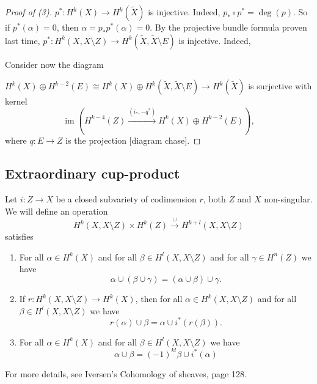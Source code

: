 \documentclass[A4paper, british, reqno]{amsart}
\theoremstyle{darkgreentheorem}
\theoremstyle{darkbluedefinition}
\theoremstyle{darkredexample}
\theoremstyle{remark}
\DeclareMathOperator{\im}{im}
\newcommand{\1}{\mathbbm{1}}
\newcommand{\op}{\oplus}
\begin{document}
\begin{proof}[Proof of (3)]
    $p^{*}\colon H^{k}(X)\to H^{k}(\tilde{X})$ is injective.
    Indeed, $p_{*}\circ p^{*}=\deg(p)$.
    So if $p^{*}(\alpha)=0$, then $\alpha=p_{*}p^{*}(\alpha)=0$.
    By the projective bundle formula proven last time, $p^{*}\colon H^{k}(X,X\setminus Z)\to H^{k}(\tilde{X},\tilde{X}\setminus E)$ is injective.
    Indeed,
    \begin{center}
    \end{center}
    Consider now the diagram
    \begin{center}
    \end{center}
    $H^{k}(X)\op H^{k-2}(E)\cong H^{k}(X)\op H^{k}(\tilde{X},\tilde{X}\setminus E)\to H^{k}(\tilde{X})$ is surjective with kernel
    \[ \im(H^{k-4}(Z)\xrightarrow{(i_{*},-q^{*})} H^{k}(X)\op H^{k-2}(E)), \]
    where $q\colon E\to Z$ is the projection [diagram chase].
\end{proof}

\subsection{Extraordinary cup-product}

Let $i\colon Z\to X$ be a closed subvariety of codimension $r$, both $Z$ and $X$ non-singular.
We will define an operation
\[ H^{k}(X,X\setminus Z)\times H^{k}(Z)\xrightarrow{\cup} H^{k+l}(X,X\setminus Z) \]
satisfies
\begin{enumerate}
    \item For all $\alpha\in H^{k}(X)$ and for all $\beta\in H^{l}(X,X\setminus Z)$ and for all $\gamma\in H^{n}(Z)$ we have
	\[ \alpha\cup (\beta \cup \gamma)=(\alpha \cup \beta)\cup \gamma. \]
    \item If $r\colon H^{k}(X,X\setminus Z)\to H^{k}(X)$, then for all $\alpha\in H^{k}(X,X\setminus Z)$ and for all $\beta \in H^{l}(X,X\setminus Z)$ we have
	\[ r(\alpha)\cup \beta=\alpha\cup i^{*}(r(\beta)). \]
    \item For all $\alpha\in H^{k}(X)$ and for all $\beta\in H^{l}(X,X\setminus Z)$ we have 
	\[ \alpha\cup \beta=(-1)^{kl}\beta\cup i^{*}(\alpha) \]
\end{enumerate}
For more details, see Iversen's Cohomology of sheaves, page 128.
\end{document}
